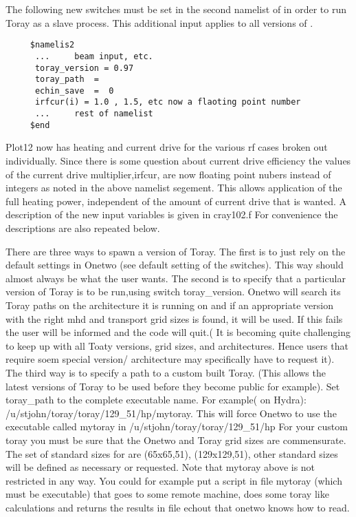 \documentclass[12pt]{article}
\begin{document}
     The following new switches must be
     set in the second namelist of \ot in order to run Toray as a
     slave process. This additional  input applies to all versions of
     \ot.

     \begin{verbatim}
     $namelis2
      ...     beam input, etc. 
      toray_version = 0.97
      toray_path  =
      echin_save  =  0
      irfcur(i) = 1.0 , 1.5, etc now a flaoting point number
      ...     rest of namelist
     $end
    \end{verbatim}


       Plot12 now has heating and current drive for the
       various rf cases broken out individually. Since there is some
       question about current drive efficiency the values of the
       current drive multiplier,irfcur,
       are now floating point nubers instead of integers as
       noted in the above namelist segement. This allows application
       of the full heating power, independent of the amount of
       current drive that is wanted.
     A description of the new input variables is given in cray102.f
     For convenience the descriptions  are also repeated below.

         There are three ways to spawn a version of Toray.
         The first is to just rely on the default settings in
         Onetwo (see default setting of the switches). This way
         should almost always be what the user wants.
         The second is to specify that a particular version
         of Toray is to be run,using switch toray\_version. Onetwo will
         search its Toray paths on the architecture it is running on 
         and if an appropriate version with the right mhd and transport grid
         sizes is found, it will be used. If this fails the user
         will be informed and the code will quit.( It is becoming quite
         challenging to keep up with all Toaty versions, grid sizes, 
         and architectures. Hence users that require soem special version/
         architecture may specifically have to request it).
         The third way is to specify a path to a custom built Toray.
         (This allows the latest  versions of Toray to be used before
         they become public for example). Set toray\_path to the complete
         executable name. For example( on Hydra): 
         /u/stjohn/toray/toray/129\_51/hp/mytoray.
         This will force Onetwo to use the executable called mytoray in
         /u/stjohn/toray/toray/129\_51/hp
         For your custom toray you must be sure that the Onetwo and
         Toray grid sizes are commensurate. The set of standard
         sizes for \ot are  (65x65,51), (129x129,51), other
         standard sizes will be defined as necessary or requested.
         Note that mytoray above is not restricted in any way. You
         could for example put a script in file mytoray (which must
         be executable) that goes to some remote machine, does some
         toray like calculations and returns the results in file
         echout that onetwo knows how to read.
\end{document}
